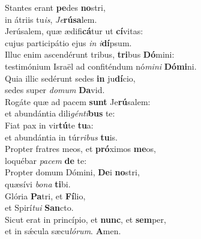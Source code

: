 \evenverse Stantes erant \textbf{pe}des \textbf{no}stri,~\*\\
\evenverse in átriis tu\textit{is}, \textit{Je}\textbf{rú}\textbf{sa}lem.\\
\oddverse Jerúsalem, quæ ædifi\textbf{cá}tur ut \textbf{cí}vitas:~\*\\
\oddverse cujus participátio ejus \textit{in} \textit{i}\textbf{dí}psum.\\
\evenverse Illuc enim ascendérunt tribus, \textbf{tri}bus \textbf{Dó}mini:~\*\\
\evenverse testimónium Israël ad confiténdum nó\textit{mi}\textit{ni} \textbf{Dó}\textbf{mi}ni.\\
\oddverse Quia illic sedérunt sedes \textbf{in} ju\textbf{dí}cio,~\*\\
\oddverse sedes super \textit{do}\textit{mum} \textbf{Da}vid.\\
\evenverse Rogáte quæ ad pacem \textbf{sunt} Je\textbf{rú}salem:~\*\\
\evenverse et abundántia dili\textit{gén}\textit{ti}\textbf{bus} te:\\
\oddverse Fiat pax in vir\textbf{tú}te \textbf{tu}a:~\*\\
\oddverse et abundántia in túr\textit{ri}\textit{bus} \textbf{tu}is.\\
\evenverse Propter fratres meos, et \textbf{pró}ximos \textbf{me}os,~\*\\
\evenverse loquébar \textit{pa}\textit{cem} \textbf{de} te:\\
\oddverse Propter domum Dómini, \textbf{De}i \textbf{no}stri,~\*\\
\oddverse quæsívi \textit{bo}\textit{na} \textbf{ti}bi.\\
\evenverse Glória \textbf{Pa}tri, et \textbf{Fí}lio,~\*\\
\evenverse et Spirí\textit{tu}\textit{i} \textbf{San}cto.\\
\oddverse Sicut erat in princípio, et \textbf{nunc}, et \textbf{sem}per,~\*\\
\oddverse et in sǽcula sæcu\textit{ló}\textit{rum}. \textbf{A}men.\\
